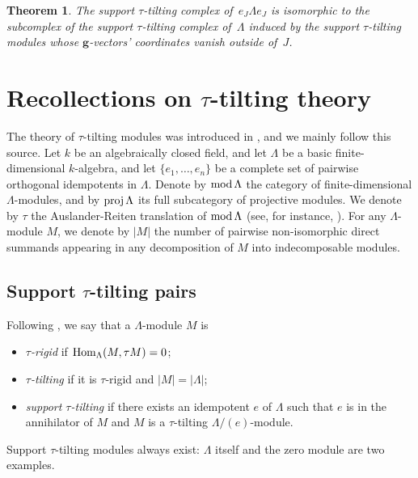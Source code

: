 \documentclass{amsart}
\newtheorem{theorem}{Theorem}%
\theoremstyle{definition}
\renewcommand{\b}[1]{\mathbf{#1}} %
\newcommand{\darkblue}{\color{darkblue}} %
\newcommand{\defn}[1]{\textsl{\darkblue #1}} %
\newcommand{\MOD}{\mbox{{\rm mod \!}}}
\newcommand{\proj}{\operatorname{{\rm proj }}}
\newcommand{\Hom}[1]{\operatorname{{\rm Hom}}_{#1}}
\begin{document}
\begin{theorem}
\label{thm:mainAlgThm}
The support $\tau$-tilting complex of~$e_J \Lambda e_J$ is isomorphic to the subcomplex of the support $\tau$-tilting complex of~$\Lambda$ induced by the support $\tau$-tilting modules whose $\b{g}$-vectors' coordinates vanish outside of~$J$.
\end{theorem}


\section{Recollections on $\tau$-tilting theory}
\label{sec:recollections}

The theory of $\tau$-tilting modules was introduced in \cite{AIR}, and we mainly follow this source.
Let $k$ be an algebraically closed field, and let $\Lambda$ be a basic finite-dimensional $k$-algebra, 
and let $\{e_1, \ldots, e_n\}$ be a complete set of pairwise orthogonal idempotents in $\Lambda$.
Denote by $\MOD \Lambda$ the category of finite-dimensional $\Lambda$-modules, 
and by $\proj \Lambda$ its full subcategory of projective modules.
We denote by $\tau$ the Auslander-Reiten translation of $\MOD \Lambda$ (see, for instance, \cite[Chapter IV]{ASS}).
For any $\Lambda$-module $M$, we denote by $|M|$ the number of pairwise non-isomorphic direct summands appearing 
in any decomposition of $M$ into indecomposable modules.


\subsection{Support $\tau$-tilting pairs}

Following \cite[Definition 0.1]{AIR}, we say that a $\Lambda$-module $M$ is 
\begin{itemize}
 \item \defn{$\tau$-rigid} if $\Hom{\Lambda}(M, \tau M) = 0$;
 \item \defn{$\tau$-tilting} if it is $\tau$-rigid and $|M|=|\Lambda|$;
 \item \defn{support $\tau$-tilting} if there exists an idempotent $e$ of $\Lambda$ such that
       $e$ is in the annihilator of $M$ and $M$ is a $\tau$-tilting $\Lambda/(e)$-module.
\end{itemize}
Support $\tau$-tilting modules always exist: $\Lambda$ itself and the zero module are two examples.
\end{document}

